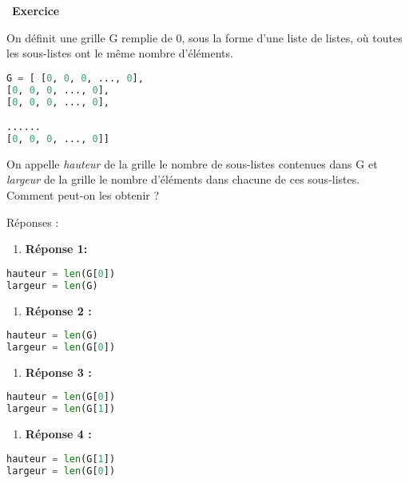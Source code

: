 \documentclass[
  11pt,
]{article}
\providecommand{\tightlist}{%
  \setlength{\itemsep}{0pt}\setlength{\parskip}{0pt}}
\newcounter{exo}
\newenvironment{exercice}[1]
{\par \medskip   \addtocounter{exo}{1} \noindent  
\begin{bclogo}[arrondi =0.1,   noborder = true, logo=\bccrayon, marge=4]{~\textbf{Exercice} \textbf{\theexo} {\itshape #1} }  \par}
{
\end{bclogo}
 \par \bigskip }
\newcounter{def}
\begin{document}
\begin{exercice}{}

On définit une grille G remplie de 0, sous la forme d'une liste de
listes, où toutes les sous-listes ont le même nombre d'éléments.

\begin{lstlisting}[language=Python]
G = [ [0, 0, 0, ..., 0],
[0, 0, 0, ..., 0],
[0, 0, 0, ..., 0],

......
[0, 0, 0, ..., 0]]
\end{lstlisting}

On appelle \emph{hauteur} de la grille le nombre de sous-listes
contenues dans G et \emph{largeur} de la grille le nombre d'éléments
dans chacune de ces sous-listes. Comment peut-on les obtenir ?

Réponses :

\begin{enumerate}
\def\labelenumi{\arabic{enumi}.}
\tightlist
\item
  \textbf{Réponse 1:}
\end{enumerate}

\begin{lstlisting}[language=Python]
hauteur = len(G[0])
largeur = len(G)
\end{lstlisting}

\begin{enumerate}
\def\labelenumi{\arabic{enumi}.}
\setcounter{enumi}{1}
\tightlist
\item
  \textbf{Réponse 2 :}
\end{enumerate}

\begin{lstlisting}[language=Python]
hauteur = len(G)
largeur = len(G[0])
\end{lstlisting}

\begin{enumerate}
\def\labelenumi{\arabic{enumi}.}
\setcounter{enumi}{2}
\tightlist
\item
  \textbf{Réponse 3 :}
\end{enumerate}

\begin{lstlisting}[language=Python]
hauteur = len(G[0])
largeur = len(G[1])
\end{lstlisting}

\begin{enumerate}
\def\labelenumi{\arabic{enumi}.}
\setcounter{enumi}{3}
\tightlist
\item
  \textbf{Réponse 4 :}
\end{enumerate}

\begin{lstlisting}[language=Python]
hauteur = len(G[1])
largeur = len(G[0])
\end{lstlisting}

\end{exercice}
\end{document}
